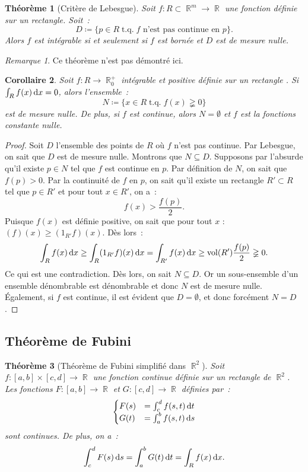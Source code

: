 \documentclass{article}
\DeclareMathOperator{\R}{\mathbb R}
\DeclareMathOperator{\tq}{ t.q. }
\DeclareMathOperator{\vol}{vol}
\newtheorem{thm}{Théorème}[section]
\newtheorem{cor}[thm]{Corollaire}
\theoremstyle{definition}
\theoremstyle{remark}
\newtheorem*{rmq}{Remarque}
\begin{document}
		\begin{thm}[Critère de Lebesgue] Soit $f : R \subset \R^m \to \R$ une fonction définie sur un rectangle. Soit~:
		\[D \coloneqq \{p \in R \tq f \text{ n'est pas continue en } p\}.\]
		Alors $f$ est intégrable si et seulement si $f$ est bornée et $D$ est de mesure nulle.
		\end{thm}

		\begin{rmq} Ce théorème n'est pas démontré ici. \end{rmq}

		\begin{cor}\label{cor:intpositive=0ssiNmesurenulle} Soit $f : R \to \R_0^+$ intégrable et positive définie sur un rectangle .
		Si $\int_R f(x)\dif x = 0$, alors l'ensemble~:
		\[N \coloneqq \{x \in R \tq f(x) \gneqq 0\}\]
		est de mesure nulle. De plus, si $f$ est continue, alors $N = \emptyset$ et $f$ est la fonctions constante nulle.
		\end{cor}

		\begin{proof} Soit $D$ l'ensemble des points de $R$ où $f$ n'est pas continue. Par Lebesgue, on sait que $D$ est de mesure nulle.
		Montrons que $N \subseteq D$. Supposons par l'absurde qu'il existe $p \in N$ tel que $f$ est continue en $p$. Par définition de $N$, on sait que $f(p) > 0$.
		Par la continuité de $f$ en $p$, on sait qu'il existe un rectangle $R' \subset R$ tel que $p \in R'$ et pour tout $x \in R'$, on a~:
		\[f(x) > \frac {f(p)}2.\]
		Puisque $f(x)$ est définie positive, on sait que pour tout $x$ : $(f)(x) \geq (1_{R'}f)(x)$. Dès lors~:
		\[\int_R f(x)\dif x \geq \int_R (1_{R'}f)(x)\dif x = \int_{R'} f(x)\dif x \geq \vol(R')\frac {f(p)}2 \gneqq 0.\]
		Ce qui est une contradiction. Dès lors, on sait $N \subseteq D$. Or un sous-ensemble d'un ensemble dénombrable est dénombrable et donc $N$ est de
		mesure nulle. Également, si $f$ est continue, il est évident que $D = \emptyset$, et donc forcément $N = D$.
		\end{proof}

	\subsection{Théorème de Fubini}
		\begin{thm}[Théorème de Fubini simplifié dans $\R^2$] Soit $f : [a, b] \times [c, d] \to \R$ une fonction continue définie sur un rectangle de $\R^2$.
		Les fonctions $F : [a, b] \to \R$ et $G : [c, d] \to \R$ définies par~:
		\[\begin{cases}F(s) &= \int_c^df(s, t)\dif t \\ G(t) &= \int_a^bf(s, t)\dif s\end{cases}\]
		sont continues. De plus, on a~:
		\[\int_c^dF(s)\dif s = \int_a^bG(t)\dif t = \int_R f(x)\dif x.\]
		\end{thm}
\end{document}
